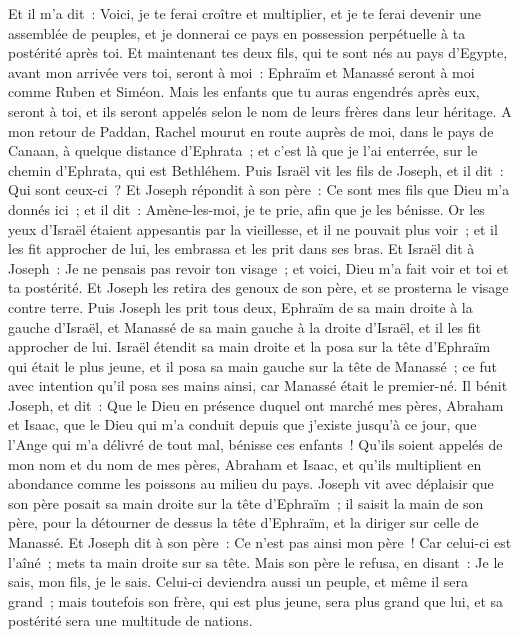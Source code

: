 \begin{multicols}{2}
Et il m'a dit~: Voici, je te ferai croître et multiplier, et je te ferai devenir une assemblée de peuples, et je donnerai ce pays en possession perpétuelle à ta postérité après toi.
Et maintenant tes deux fils, qui te sont nés au pays d'Egypte, avant mon arrivée vers toi, seront à moi~: Ephraïm et Manassé seront à moi comme Ruben et Siméon.
Mais les enfants que tu auras engendrés après eux, seront à toi, et ils seront appelés selon le nom de leurs frères dans leur héritage.
A mon retour de Paddan, Rachel mourut en route auprès de moi, dans le pays de Canaan, à quelque distance d'Ephrata~; et c'est là que je l'ai enterrée, sur le chemin d'Ephrata, qui est Bethléhem.
Puis Israël vit les fils de Joseph, et il dit~: Qui sont ceux-ci~?
Et Joseph répondit à son père~: Ce sont mes fils que Dieu m'a donnés ici~; et il dit~: Amène-les-moi, je te prie, afin que je les bénisse.
Or les yeux d'Israël étaient appesantis par la vieillesse, et il ne pouvait plus voir~; et il les fit approcher de lui, les embrassa et les prit dans ses bras.
Et Israël dit à Joseph~: Je ne pensais pas revoir ton visage~; et voici, Dieu m'a fait voir et toi et ta postérité.
Et Joseph les retira des genoux de son père, et se prosterna le visage contre terre.
Puis Joseph les prit tous deux, Ephraïm de sa main droite à la gauche d'Israël, et Manassé de sa main gauche à la droite d'Israël, et il les fit approcher de lui.
Israël étendit sa main droite et la posa sur la tête d'Ephraïm qui était le plus jeune, et il posa sa main gauche sur la tête de Manassé~; ce fut avec intention qu'il posa ses mains ainsi, car Manassé était le premier-né.
Il bénit Joseph, et dit~: Que le Dieu en présence duquel ont marché mes pères, Abraham et Isaac, que le Dieu qui m'a conduit depuis que j'existe jusqu'à ce jour,
que l'Ange qui m'a délivré de tout mal, bénisse ces enfants~! Qu'ils soient appelés de mon nom et du nom de mes pères, Abraham et Isaac, et qu'ils multiplient en abondance comme les poissons au milieu du pays.
Joseph vit avec déplaisir que son père posait sa main droite sur la tête d'Ephraïm~; il saisit la main de son père, pour la détourner de dessus la tête d'Ephraïm, et la diriger sur celle de Manassé.
Et Joseph dit à son père~: Ce n'est pas ainsi mon père~! Car celui-ci est l'aîné~; mets ta main droite sur sa tête.
Mais son père le refusa, en disant~: Je le sais, mon fils, je le sais. Celui-ci deviendra aussi un peuple, et même il sera grand~; mais toutefois son frère, qui est plus jeune, sera plus grand que lui, et sa postérité sera une multitude de nations.

\end{multicols}
